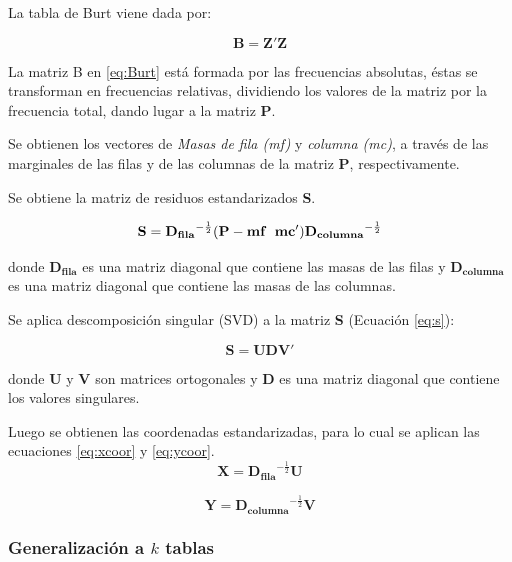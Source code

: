 \documentclass[mathematics,article,submit,moreauthors,pdftex]{mdpi}
\begin{document}
La tabla de Burt viene dada por:

\begin{equation}
\mathbf{B}=\mathbf{Z'}\mathbf{Z}
\label{eq:Burt}
\end{equation}

La matriz B en \ref{eq:Burt} está formada por las frecuencias absolutas,
éstas se transforman en frecuencias relativas, dividiendo los valores de
la matriz por la frecuencia total, dando lugar a la matriz \textbf{P}.

Se obtienen los vectores de \emph{Masas de fila (mf)} y \emph{columna
(mc)}, a través de las marginales de las filas y de las columnas de la
matriz \textbf{P}, respectivamente.

Se obtiene la matriz de residuos estandarizados \textbf{S}.

\begin{equation}
\mathbf{S}=\mathbf{D_{fila}}^{-\frac{1}{2}}(\mathbf{P}-\mathbf{mf} \hspace{0.2cm} \mathbf{mc'})\mathbf{D_{columna}}^{-\frac{1}{2}}
\label{eq:s}
\end{equation}

donde \(\mathbf{D_{fila}}\) es una matriz diagonal que contiene las
masas de las filas y \(\mathbf{D_{columna}}\) es una matriz diagonal que
contiene las masas de las columnas.

Se aplica descomposición singular (SVD) a la matriz \textbf{S} (Ecuación
\ref{eq:s}):

\begin{equation}
\mathbf{S}=\mathbf{U}\mathbf{D}\mathbf{V'}
\label{eq:svd}
\end{equation}

donde \(\mathbf{U}\) y \(\mathbf{V}\) son matrices ortogonales y
\(\mathbf{D}\) es una matriz diagonal que contiene los valores
singulares.

Luego se obtienen las coordenadas estandarizadas, para lo cual se
aplican las ecuaciones \ref{eq:xcoor} y \ref{eq:ycoor}. \begin{equation}
\mathbf{X}=\mathbf{D_{fila}}^{-\frac{1}{2}} \mathbf{U}
\label{eq:xcoor}
\end{equation}

\begin{equation}
\mathbf{Y}=\mathbf{D_{columna}}^{-\frac{1}{2}} \mathbf{V}
\label{eq:ycoor}
\end{equation}

\hypertarget{generalizaciuxf3n-a-k-tablas}{%
\subsubsection{\texorpdfstring{Generalización a \(k\)
tablas}{Generalización a k tablas}}\label{generalizaciuxf3n-a-k-tablas}}
\end{document}
